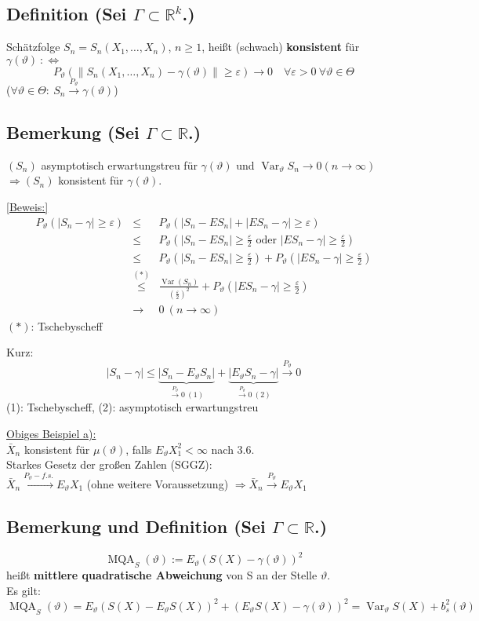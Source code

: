 \documentclass[a4paper,11pt,twoside,titlepage]{article}
\newcommand{\R}{{\mathbb R}}
\DeclareMathOperator{\var}{Var}
\DeclareMathOperator{\MQA}{MQA}
\begin{document}
\subsection{Definition \textnormal{(Sei $\Gamma\subset\R^k$.)}}
Schätzfolge $S_n=S_n(X_1,\ldots,X_n)$, $n\geq1$, heißt (schwach) \textbf{konsistent} für $\gamma(\vartheta)\ :\Leftrightarrow$
\[P_\vartheta(\|S_n(X_1,\ldots,X_n)-\gamma(\vartheta)\|\geq\varepsilon)\to0\quad\forall\varepsilon>0\ \forall\vartheta\in\Theta\]
($\forall\vartheta\in\Theta:\ S_n\stackrel{P_\vartheta}{\to}\gamma(\vartheta)$)

\subsection{Bemerkung \textnormal{(Sei $\Gamma\subset\R$.)}}
$(S_n)$ asymptotisch erwartungstreu für $\gamma(\vartheta)$ und $\var_\vartheta S_n\to0 (n\to\infty)$ $\Rightarrow (S_n)$ konsistent für $\gamma(\vartheta)$.

\underline{[Beweis:]}
\begin{eqnarray*}
P_\vartheta(|S_n-\gamma|\geq\varepsilon)&\leq&P_\vartheta(|S_n-ES_n|+|ES_n-\gamma|\geq\varepsilon)\\
&\leq&P_\vartheta(|S_n-ES_n|\geq\frac\varepsilon2\mbox{ oder }|ES_n-\gamma|\geq\frac\varepsilon2)\\
&\leq&P_\vartheta(|S_n-ES_n|\geq\frac\varepsilon2)+P_\vartheta(|ES_n-\gamma|\geq\frac\varepsilon2)\\
&\stackrel{(\ast)}{\leq}&\frac{\var(S_n)}{(\frac\varepsilon2)^2}+P_\vartheta(|ES_n-\gamma|\geq\frac\varepsilon2)\\
&\to&0\ (n\to\infty)\end{eqnarray*}
$(\ast)$: Tschebyscheff

Kurz:
\[|S_n-\gamma|\leq\underbrace{|S_n-E_\vartheta S_n|}_{\stackrel{P_\vartheta}{\to}0\ (1)}+\underbrace{|E_\vartheta S_n-\gamma|}_{\stackrel{P_\vartheta}{\to}0\ (2)}\stackrel{P_\vartheta}{\to}0\]
(1): Tschebyscheff, (2): asymptotisch erwartungstreu


\underline{Obiges Beispiel a):}\\
$\bar X_n$ konsistent für $\mu(\vartheta)$, falls $E_\vartheta X_1^2<\infty$ nach 3.6.\\
Starkes Gesetz der großen Zahlen (SGGZ):\\ $\bar X_n\stackrel{P_\vartheta-f.s.}{\to}E_\vartheta X_1$ (ohne weitere Voraussetzung) $\Rightarrow \bar X_n\stackrel{P_\vartheta}{\to}E_\vartheta X_1$

\subsection{Bemerkung und Definition \textnormal{(Sei $\Gamma\subset\R$.)}}
\[\MQA_S(\vartheta):=E_\vartheta(S(X)-\gamma(\vartheta))^2\]
heißt \textbf{mittlere quadratische Abweichung} von S an der Stelle $\vartheta$.\\
Es gilt:
\[\MQA_S(\vartheta)=E_\vartheta(S(X)-E_\vartheta S(X))^2+(E_\vartheta S(X)-\gamma(\vartheta))^2=\var_\vartheta S(X)+b_s^2(\vartheta)\]
\end{document}
